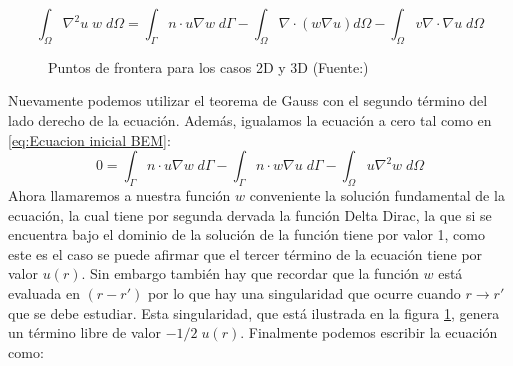 \begin{equation}
\int_\Omega \nabla^2u\;w\;d\Omega=\int_\Gamma n\cdot u\nabla w\;d\Gamma-\int_\Omega\nabla\cdot(w\nabla u)d\Omega-\int_\Omega v\nabla\cdot\nabla u\;d\Omega
\end{equation}
\begin{figure}[H]

\centering
{}
\caption{Puntos de frontera para los casos 2D y 3D (Fuente:\cite{Brebbia})}\label{fig:Singularidades}
\end{figure}
Nuevamente podemos utilizar el teorema de Gauss con el segundo término del lado derecho de la ecuación. Además, igualamos la ecuación a cero tal como en \eqref{eq:Ecuacion inicial BEM}:
\begin{equation}
0=\int_\Gamma n\cdot u\nabla w\;d\Gamma-\int_\Gamma n\cdot w\nabla u\;d\Gamma-\int_\Omega u \nabla^2 w\;d\Omega
\end{equation}
Ahora llamaremos a nuestra función $w$ conveniente la solución fundamental de la ecuación, la cual tiene por segunda dervada la función Delta Dirac, la que si se encuentra bajo el dominio de la solución de la función tiene por valor 1, como este es el caso se puede afirmar que el tercer término de la ecuación tiene por valor $u(r)$. Sin embargo también hay que recordar que la función $w$ está evaluada en $(r-r')$ por lo que hay una singularidad que ocurre cuando $r\rightarrow r'$ que se debe estudiar. Esta singularidad, que está ilustrada en la figura \ref{fig:Singularidades}, genera un término libre de valor $-1/2\;u(r)$. Finalmente podemos escribir la ecuación como:
